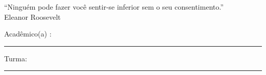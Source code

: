 \documentclass[12pt, a4paper,final]{article}
\begin{document}

\begin{large}
\begin{center}


\end{center}
\end{large}

\begin{flushright}
``Ninguém pode fazer você sentir-se inferior sem o seu consentimento.''\\{\footnotesize  Eleanor Roosevelt}
\end{flushright}


\vskip 0.5cm Acad\^emico(a) : \rule{10cm}{0.4pt} Turma:  \rule{1cm}{0.4pt}
\noindent
\end{document}
